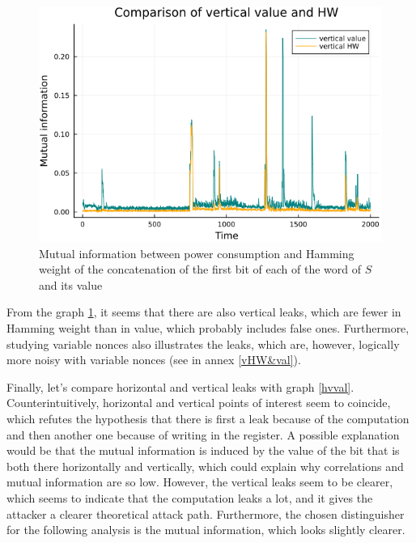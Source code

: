 \documentclass[11pt,technote]{IEEEtran}
\begin{document}
		\begin{figure}[h!]
			\centering
			\includegraphics[scale=0.4]{img_files/vertical_one_bit}
			\caption{Mutual information between power consumption and Hamming weight of the concatenation of the first bit of each of the word of $S$ and its value}
			\label{vHW}
		\end{figure}
		
		From the graph \ref{vHW}, it seems that there are also vertical leaks, which are fewer in Hamming weight than in value, which probably includes false ones. Furthermore, studying variable nonces also illustrates the leaks, which are, however, logically more noisy with variable nonces (see in annex \ref{vHW&val}).
		
		Finally, let's compare horizontal and vertical leaks with graph \ref{hvval}. Counterintuitively, horizontal and vertical points of interest seem to coincide, which refutes the hypothesis that there is first a leak because of the computation and then another one because of writing in the register. A possible explanation would be that the mutual information is induced by the value of the bit that is both there horizontally and vertically, which could explain why correlations and mutual information are so low. However, the vertical leaks seem to be clearer, which seems to indicate that the computation leaks a lot, and it gives the attacker a clearer theoretical attack path. Furthermore, the chosen distinguisher for the following analysis is the mutual information, which looks slightly clearer.
		
\end{document}
